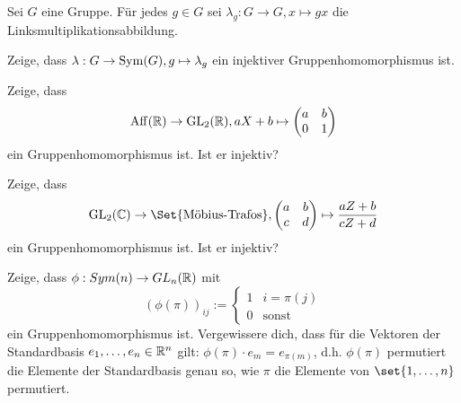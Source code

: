 \begin{sheet}
\begin{problem}[title={Cayley-Einbettung; \enquote{Jede Gruppe ist eine Permutationsgruppe}}]
Sei $G$ eine Gruppe. Für jedes $g\in G$ sei $\lambda_g: G\to G, x\mapsto gx$ die Linksmultiplikationsabbildung.

Zeige, dass $\lambda: G\to \operatorname{Sym}(G), g\mapsto\lambda_g$ ein injektiver Gruppenhomomorphismus ist.
\end{problem}

\begin{problem}
Zeige, dass
\[\operatorname{Aff}(\mathbb{R})\to\operatorname{GL}_2(\mathbb{R}), aX+b \mapsto \begin{pmatrix} a & b \\ 0 & 1 \end{pmatrix}\]
ein Gruppenhomomorphismus ist. Ist er injektiv?
\end{problem}

\begin{problem}
Zeige, dass
\[\operatorname{GL}_2(\IC)\to \Set{\text{Möbius-Trafos}}, \begin{pmatrix} a & b \\ c & d \end{pmatrix} \mapsto \frac{aZ+b}{cZ+d}\]
ein Gruppenhomomorphismus ist. Ist er injektiv?
\end{problem}

\begin{problem}[title={Permutationsmatrizen}]
Zeige, dass $\phi: Sym(n) \to GL_n(\mathbb{R})$ mit
\[(\phi(\pi))_{ij} := \begin{cases} 1 & i=\pi(j) \\ 0 & \text{sonst} \end{cases}\]
ein Gruppenhomomorphismus ist. Vergewissere dich, dass für die Vektoren der Standardbasis $e_1,\ldots,e_n\in\mathbb{R}^n$ gilt: $\phi(\pi)\cdot e_m = e_{\pi(m)}$, d.h. $\phi(\pi)$ permutiert die Elemente der Standardbasis genau so, wie $\pi$ die Elemente von $\set{1,\ldots,n}$ permutiert.
\end{problem}


\end{sheet}